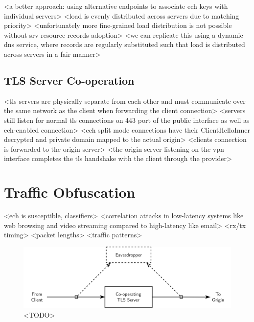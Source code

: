 <a better approach: using alternative endpoints to associate ech keys with individual servers>
<load is evenly distributed across servers due to matching priority>
<unfortunately more fine-grained load distribution is not possible without srv resource records adoption>
<we can replicate this using a dynamic dns service, where records are regularly substituted such that load is distributed across servers in a fair manner>

\subsection{TLS Server Co-operation}

<tls servers are physically separate from each other and must communicate over the same network as the client when forwarding the client connection>
<servers still listen for normal tls connections on 443 port of the public interface as well as ech-enabled connection>
<ech split mode connections have their ClientHelloInner decrypted and private domain mapped to the actual origin>
<clients connection is forwarded to the origin server>
<the origin server listening on the vpn interface completes the tls handshake with the client through the provider>







\section{Traffic Obfuscation}

<ech is susceptible, classifiers>\cite{trevisan2023attacking}
<correlation attacks in low-latency systems like web browsing and video streaming compared to high-latency like email>\cite{levine2004timing}
<rx/tx timing> <packet lengths> <traffic patterns> \cite{defabbia2011analyzing}

\begin{figure}[ht]
\centerline{\includegraphics[width=150mm]{images/correlation-attack.png}}
\caption[Diagram of how a correlation attack can be used]{<TODO>}
\label{correlation_figure}
\end{figure}

